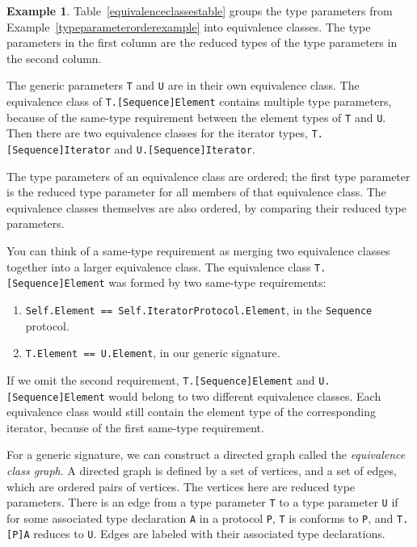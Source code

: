 \documentclass[a4paper,headsepline,bibliography=totoc,toc=flat,fleqn,twoside=semi]{scrbook}
\theoremstyle{definition}
\theoremstyle{definition}
\newtheorem{example}{Example}[chapter]
\theoremstyle{definition}
\begin{document}
\begin{example}
Table~\ref{equivalenceclassestable} groups the type parameters from Example~\ref{typeparameterorderexample} into equivalence classes. The type parameters in the first column are the reduced types of the type parameters in the second column.

The generic parameters \texttt{T} and \texttt{U} are in their own equivalence class. The equivalence class of \texttt{T.[Sequence]Element} contains multiple type parameters, because of the same-type requirement between the element types of \texttt{T} and \texttt{U}. Then there are two equivalence classes for the iterator types, \texttt{T.[Sequence]Iterator} and \texttt{U.[Sequence]Iterator}.

The type parameters of an equivalence class are ordered; the first type parameter is the reduced type parameter for all members of that equivalence class. The equivalence classes themselves are also ordered, by comparing their reduced type parameters.

You can think of a same-type requirement as merging two equivalence classes together into a larger equivalence class. The equivalence class \texttt{T.[Sequence]Element} was formed by two same-type requirements:
\begin{enumerate}
\item \texttt{Self.Element == Self.IteratorProtocol.Element}, in the \texttt{Sequence} protocol.
\item \texttt{T.Element == U.Element}, in our generic signature.
\end{enumerate}
If we omit the second requirement, \texttt{T.[Sequence]Element} and \texttt{U.[Sequence]Element} would belong to two different equivalence classes. Each equivalence class would still contain the element type of the corresponding iterator, because of the first same-type requirement.
\end{example}

For a generic signature, we can construct a directed graph called the \emph{equivalence class graph}. A directed graph is defined by a set of vertices, and a set of edges, which are ordered pairs of vertices. The vertices here are reduced type parameters. There is an edge from a type parameter \texttt{T} to a type parameter \texttt{U} if for some associated type declaration \texttt{A} in a protocol \texttt{P}, \texttt{T} is conforms to \texttt{P}, and \texttt{T.[P]A} reduces to \texttt{U}. Edges are labeled with their associated type declarations.
\end{document}
